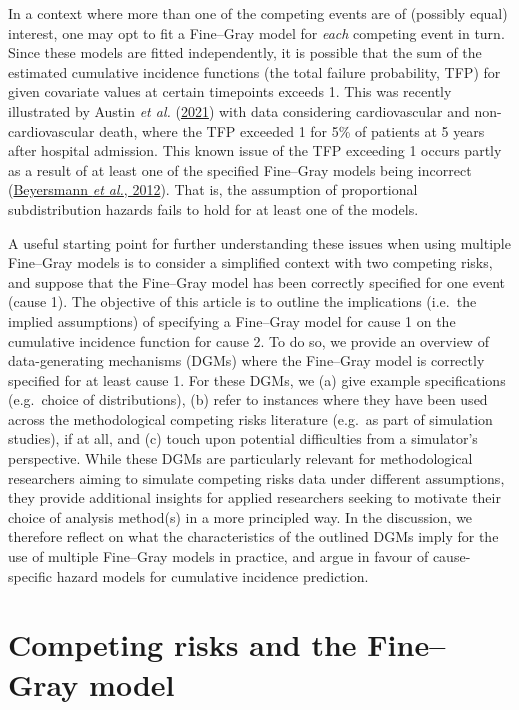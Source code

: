 \documentclass[
  letterpaper,
  DIV=11,
  numbers=noendperiod]{scrreprt}
\begin{document}
In a context where more than one of the competing events are of
(possibly equal) interest, one may opt to fit a Fine--Gray model for
\emph{each} competing event in turn. Since these models are fitted
independently, it is possible that the sum of the estimated cumulative
incidence functions (the total failure probability, TFP) for given
covariate values at certain timepoints exceeds 1. This was recently
illustrated by Austin \emph{et al.}
(\protect\hyperlink{ref-austinFineGraySubdistributionHazard2021}{2021})
with data considering cardiovascular and non-cardiovascular death, where
the TFP exceeded 1 for 5\% of patients at 5 years after hospital
admission. This known issue of the TFP exceeding 1 occurs partly as a
result of at least one of the specified Fine--Gray models being
incorrect
(\protect\hyperlink{ref-beyersmannCompetingRisksMultistate2012}{Beyersmann
\emph{et al.}, 2012}). That is, the assumption of proportional
subdistribution hazards fails to hold for at least one of the models.

A useful starting point for further understanding these issues when
using multiple Fine--Gray models is to consider a simplified context
with two competing risks, and suppose that the Fine--Gray model has been
correctly specified for one event (cause 1). The objective of this
article is to outline the implications (i.e.~the implied assumptions) of
specifying a Fine--Gray model for cause 1 on the cumulative incidence
function for cause 2. To do so, we provide an overview of
data-generating mechanisms (DGMs) where the Fine--Gray model is
correctly specified for at least cause 1. For these DGMs, we (a) give
example specifications (e.g.~choice of distributions), (b) refer to
instances where they have been used across the methodological competing
risks literature (e.g.~as part of simulation studies), if at all, and
(c) touch upon potential difficulties from a simulator's perspective.
While these DGMs are particularly relevant for methodological
researchers aiming to simulate competing risks data under different
assumptions, they provide additional insights for applied researchers
seeking to motivate their choice of analysis method(s) in a more
principled way. In the discussion, we therefore reflect on what the
characteristics of the outlined DGMs imply for the use of multiple
Fine--Gray models in practice, and argue in favour of cause-specific
hazard models for cumulative incidence prediction.

\hypertarget{competing-risks-and-the-finegray-model}{%
\section{Competing risks and the Fine--Gray
model}\label{competing-risks-and-the-finegray-model}}
\end{document}
